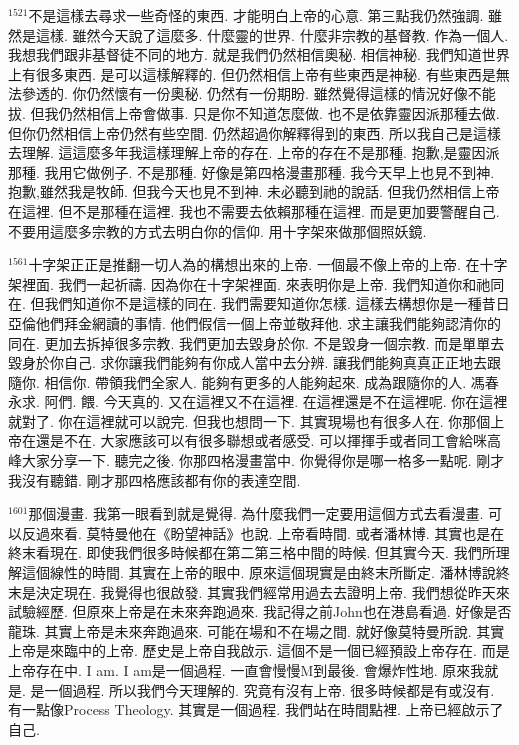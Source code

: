 \documentclass{book}
\begin{document}
$^{1521}$不是這樣去尋求一些奇怪的東西.
才能明白上帝的心意.
第三點我仍然強調.
雖然是這樣.
雖然今天說了這麼多.
什麼靈的世界.
什麼非宗教的基督教.
作為一個人.
我想我們跟非基督徒不同的地方.
就是我們仍然相信奧秘.
相信神秘.
我們知道世界上有很多東西.
是可以這樣解釋的.
但仍然相信上帝有些東西是神秘.
有些東西是無法參透的.
你仍然懷有一份奧秘.
仍然有一份期盼.
雖然覺得這樣的情況好像不能拔.
但我仍然相信上帝會做事.
只是你不知道怎麼做.
也不是依靠靈因派那種去做.
但你仍然相信上帝仍然有些空間.
仍然超過你解釋得到的東西.
所以我自己是這樣去理解.
這這麼多年我這樣理解上帝的存在.
上帝的存在不是那種.
抱歉,是靈因派那種.
我用它做例子.
不是那種.
好像是第四格漫畫那種.
我今天早上也見不到神.
抱歉,雖然我是牧師.
但我今天也見不到神.
未必聽到祂的說話.
但我仍然相信上帝在這裡.
但不是那種在這裡.
我也不需要去依賴那種在這裡.
而是更加要警醒自己.
不要用這麼多宗教的方式去明白你的信仰.
用十字架來做那個照妖鏡.

$^{1561}$十字架正正是推翻一切人為的構想出來的上帝.
一個最不像上帝的上帝.
在十字架裡面.
我們一起祈禱.
因為你在十字架裡面.
來表明你是上帝.
我們知道你和祂同在.
但我們知道你不是這樣的同在.
我們需要知道你怎樣.
這樣去構想你是一種昔日亞倫他們拜金網讀的事情.
他們假信一個上帝並敬拜他.
求主讓我們能夠認清你的同在.
更加去拆掉很多宗教.
我們更加去毀身於你.
不是毀身一個宗教.
而是單單去毀身於你自己.
求你讓我們能夠有你成人當中去分辨.
讓我們能夠真真正正地去跟隨你.
相信你.
帶領我們全家人.
能夠有更多的人能夠起來.
成為跟隨你的人.
馮春永求.
阿們.
餵.
今天真的.
又在這裡又不在這裡.
在這裡還是不在這裡呢.
你在這裡就對了.
你在這裡就可以說完.
但我也想問一下.
其實現場也有很多人在.
你那個上帝在還是不在.
大家應該可以有很多聯想或者感受.
可以揮揮手或者同工會給咪高峰大家分享一下.
聽完之後.
你那四格漫畫當中.
你覺得你是哪一格多一點呢.
剛才我沒有聽錯.
剛才那四格應該都有你的表達空間.

$^{1601}$那個漫畫.
我第一眼看到就是覺得.
為什麼我們一定要用這個方式去看漫畫.
可以反過來看.
莫特曼他在《盼望神話》也說.
上帝看時間.
或者潘林博.
其實也是在終末看現在.
即使我們很多時候都在第二第三格中間的時候.
但其實今天.
我們所理解這個線性的時間.
其實在上帝的眼中.
原來這個現實是由終末所斷定.
潘林博說終末是決定現在.
我覺得也很啟發.
其實我們經常用過去去證明上帝.
我們想從昨天來試驗經歷.
但原來上帝是在未來奔跑過來.
我記得之前John也在港島看過.
好像是否龍珠.
其實上帝是未來奔跑過來.
可能在場和不在場之間.
就好像莫特曼所說.
其實上帝是來臨中的上帝.
歷史是上帝自我啟示.
這個不是一個已經預設上帝存在.
而是上帝存在中.
I am.
I am是一個過程.
一直會慢慢M到最後.
會爆炸性地.
原來我就是.
是一個過程.
所以我們今天理解的.
究竟有沒有上帝.
很多時候都是有或沒有.
有一點像Process Theology.
其實是一個過程.
我們站在時間點裡.
上帝已經啟示了自己.
\end{document}
